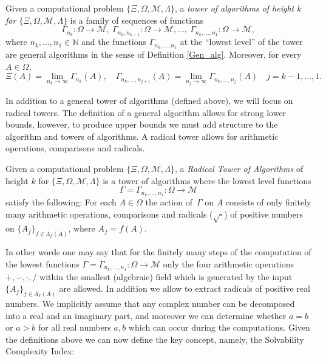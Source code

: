 \documentclass[a4paper,10pt]{article}
\begin{document}
\begin{definition}\label{tower_funct}
Given a computational problem $\{\Xi,\Omega,\mathcal{M},\Lambda\}$, a \emph{tower of algorithms of height $k$
 for $\{\Xi,\Omega,\mathcal{M},\Lambda\}$} is a family of sequences of functions
 $$\Gamma_{n_k}:\Omega
\rightarrow \mathcal{M},\ \Gamma_{n_k, n_{k-1}}:\Omega
\rightarrow \mathcal{M},\dots,\ \Gamma_{n_k, \hdots, n_1}:\Omega \rightarrow \mathcal{M},
$$
where $n_k,\hdots,n_1 \in \mathbb{N}$ and the functions $\Gamma_{n_k, \hdots, n_1}$ at the ``lowest level'' of the tower are general algorithms in the sense of Definition \ref{Gen_alg}. Moreover, for every $A \in \Omega$,
$$
\Xi(A)= \lim_{n_k \rightarrow \infty} \Gamma_{n_k}(A), \quad \Gamma_{n_k, \hdots, n_{j+1}}(A)= \lim_{n_j \rightarrow \infty} \Gamma_{n_k, \hdots, n_j}(A) \quad j=k-1,\dots,1.
$$
\end{definition}

In addition to a general tower of algorithms (defined above), we will focus on radical towers. The definition of a general algorithm allows for strong lower bounds, however, to produce upper bounds we must add structure to the algorithm and towers of algorithms. A radical tower allows for arithmetic operations, comparisons and radicals. 

\begin{definition}
Given a computational problem $\{\Xi,\Omega,\mathcal{M},\Lambda\}$, a \emph{Radical Tower of Algorithms} of height $k$
 for $\{\Xi,\Omega,\mathcal{M},\Lambda\}$ is a tower of algorithms where the lowest level functions 
 $$
 \Gamma = \Gamma_{n_k, \hdots, n_1} :\Omega \rightarrow \mathcal{M}
 $$ satisfy the following:
 For each $A\in\Omega$
the action of $\,\Gamma$ on $A$ consists of only finitely many arithmetic operations, comparisons and radicals ($\sqrt{\cdot}$) of positive numbers on 
$\{A_f\}_{f \in \Lambda_\Gamma(A)}$, where $A_f = f(A)$.
\end{definition}

In other words one may say that for the finitely many steps of the computation of the lowest functions $\Gamma = \Gamma_{n_k, \hdots, n_1} :\Omega \rightarrow \mathcal{M}$ only the four arithmetic operations $+, -, \cdot, /$ within the smallest (algebraic) field which is generated by the input $\{A_f\}_{f \in \Lambda_\Gamma(A)}$ are allowed. In addition we allow to extract radicals of positive real numbers.
 We implicitly assume that any complex number can be decomposed into a real and an imaginary part, and moreover we can determine whether $a = b$ or $a > b$ for all real numbers $a,b$ which can occur during the computations.
Given the definitions above we can now define the key concept, namely, the Solvability Complexity Index: 
\end{document}
